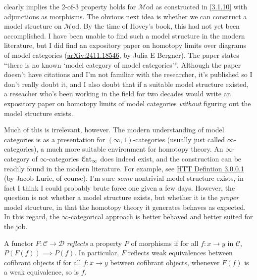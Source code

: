 \begin{remark}\label{3.3.7}
	 clearly implies the 2-of-3 property holds for $\mathcal{M} \mathrm{od} $ as constructed in \cref{3.1.10} with adjunctions as morphisms. The obvious next idea is whether we can construct a model structure on $\mathcal{M} \mathrm{od} $. By the time of Hovey's book, this had not yet been accomplished. I have been unable to find such a model structure in the modern literature, but I did find an expository paper on homotopy limits over diagrams of model categories (\href{https://arxiv.org/abs/2411.18546}{arXiv:2411.18546}, by Julia E Bergner). The paper states ``there is no known `model category of model categories'''. Although the paper doesn't have citations and I'm not familiar with the researcher, it's published so I don't really doubt it, and I also doubt that if a suitable model structure existed, a reseacher who's been working in the field for two decades would write an expository paper on homotopy limits of model categories \emph{without} figuring out the model structure exists.

	Much of this is irrelevant, however. The modern understanding of model categories is as a presentation for $(\infty ,1)$-categories (usually just called $\infty $-categories), a much more suitable environment for homotopy theory. An $\infty $-category of $\infty $-categories $\mathcal{C}\mathrm{at}_\infty $ does indeed exist, and the construction can be readily found in the modern literature. For example, see \href{https://www.math.ias.edu/~lurie/papers/HTT.pdf#page805}{HTT Defintion 3.0.0.1} (by Jacob Lurie, of course). I'm sure \emph{some} nontrivial model structure exists, in fact I think I could probably brute force one given a few days. However, the question is not whether a model structure exists, but whether it is the \emph{proper} model structure, in that the homotopy theory it generates behaves as expected. In this regard, the $\infty $-categorical approach is better behaved and better suited for the job.
\end{remark}

\begin{remark}\label{3.3.8}
	A functor $F : \mathcal{C}  \to \mathcal{D} $ \emph{reflects} a property $P$ of morphisms if for all $f : x \to y$ in $\mathcal{C} $, $P(F(f))\implies P(f)$. In particular, $F$ reflects weak equivalences between cofibrant objects if for all $f : x \to y$ between cofibrant objects, whenever $F(f)$ is a weak equivalence, so is $f$.
\end{remark}

